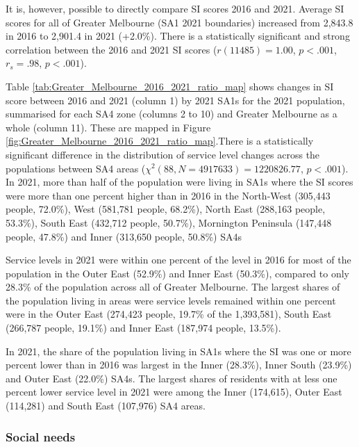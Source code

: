 \documentclass[preprint, 3p,
authoryear]{elsarticle} %
\begin{document}
It is, however, possible to directly compare SI scores 2016 and 2021.
Average SI scores for all of Greater Melbourne (SA1 2021 boundaries)
increased from 2,843.8 in 2016 to 2,901.4 in 2021 (+2.0\%). There is a
statistically significant and strong correlation between the 2016 and
2021 SI scores (\(r(11485) = 1.00\), \(p < .001\), \(r_s =.98\),
\(p < .001\)).

Table \ref{tab:Greater_Melbourne_2016_2021_ratio_map} shows changes in
SI score between 2016 and 2021 (column 1) by 2021 SA1s for the 2021
population, summarised for each SA4 zone (columns 2 to 10) and Greater
Melbourne as a whole (column 11). These are mapped in Figure
\ref{fig:Greater_Melbourne_2016_2021_ratio_map}.There is a statistically
significant difference in the distribution of service level changes
across the populations between SA4 areas
(\(\chi^2(88, N = 4917633) = 1220826.77\), \(p < .001\)). In 2021, more
than half of the population were living in SA1s where the SI scores were
more than one percent higher than in 2016 in the North-West (305,443
people, 72.0\%), West (581,781 people, 68.2\%), North East (288,163
people, 53.3\%), South East (432,712 people, 50.7\%), Mornington
Peninsula (147,448 people, 47.8\%) and Inner (313,650 people, 50.8\%)
SA4s

Service levels in 2021 were within one percent of the level in 2016 for
most of the population in the Outer East (52.9\%) and Inner East
(50.3\%), compared to only 28.3\% of the population across all of
Greater Melbourne. The largest shares of the population living in areas
were service levels remained within one percent were in the Outer East
(274,423 people, 19.7\% of the 1,393,581), South East (266,787 people,
19.1\%) and Inner East (187,974 people, 13.5\%).

In 2021, the share of the population living in SA1s where the SI was one
or more percent lower than in 2016 was largest in the Inner (28.3\%),
Inner South (23.9\%) and Outer East (22.0\%) SA4s. The largest shares of
residents with at less one percent lower service level in 2021 were
among the Inner (174,615), Outer East (114,281) and South East (107,976)
SA4 areas.

\subsubsection{Social needs}\label{social-needs}
\end{document}
